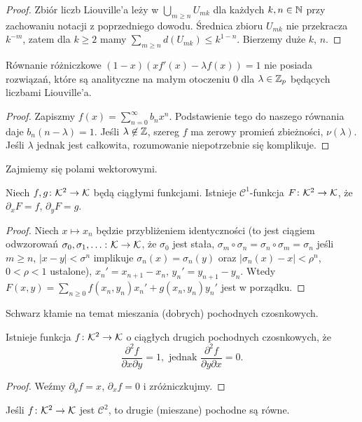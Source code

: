 \begin{proof}
	Zbiór liczb Liouville'a leży w $\bigcup_{m \ge n} U_{mk}$ dla każdych $k, n \in \mathbb N$ przy zachowaniu notacji z poprzedniego dowodu.
	Średnica zbioru $U_{mk}$ nie przekracza $k^{-m}$, zatem dla $k \ge 2$ mamy $\sum_{m \ge n} d(U_{mk}) \le k^{1-n}$.
	Bierzemy duże $k$, $n$.
\end{proof}

\begin{fakt}
	Równanie różniczkowe $(1-x)(x f'(x) - \lambda f(x)) = 1$ nie posiada rozwiązań, które są analityczne na małym otoczeniu $0$ dla $\lambda \in \mathbb Z_p$ będących liczbami Liouville'a.
\end{fakt}

\begin{proof}
	Zapiszmy $f(x) = \sum_{n=0}^\infty b_n x^n$.
	Podstawienie tego do naszego równania daje $b_n (n - \lambda ) = 1$.
	Jeśli $\lambda \not \in \mathbb Z$, szereg $f$ ma zerowy promień zbieżności, $\nu(\lambda)$.
	Jeśli $\lambda$ jednak jest całkowita, rozumowanie niepotrzebnie się komplikuje.
\end{proof}

Zajmiemy się polami wektorowymi.

\begin{fakt}
	Niech $f, g \colon \mathcal K^2 \to \mathcal K$ będą ciągłymi funkcjami.
	Istnieje $\mathcal C^1$-funkcja $F \colon \mathcal K^2 \to \mathcal K$, że $\partial_x F = f$, $\partial_y F = g$.
\end{fakt}

\begin{proof}
	Niech $x \mapsto x_n$ będzie przybliżeniem identyczności (to jest ciągiem odwzorowań $\sigma_0, \sigma_1, \ldots \colon \mathcal K \to \mathcal K$, że $\sigma_0$ jest stała, $\sigma_m \circ \sigma_n = \sigma_n \circ \sigma_m = \sigma_n$ jeśli $m \ge n$, $|x - y| < \sigma^n$ implikuje $\sigma_n(x) = \sigma_n(y)$ oraz $|\sigma_n(x) - x| < \rho^n$, $0 < \rho < 1$ ustalone), $x_n' = x_{n+1} - x_n$, $y_n' = y_{n+1} - y_n$. 
	Wtedy $F(x, y) = \sum_{n \ge 0} f(x_n, y_n)x_n' +g(x_n, y_n)y_n'$ jest w porządku.
\end{proof}

Schwarz kłamie na temat mieszania (dobrych) pochodnych czosnkowych.

\begin{wniosek}
	Istnieje funkcja $f \colon \mathcal K^2 \to \mathcal K$ o ciągłych drugich pochodnych czosnkowych, że
	\[
		\frac{\partial^2 f}{\partial x \partial y} = 1, \mbox{ jednak }
		\frac{\partial^2 f}{\partial y \partial x} = 0.
	\]
\end{wniosek}

\begin{proof}
	Weźmy $\partial_y f = x$, $\partial_xf = 0$ i zróżniczkujmy.
\end{proof}

\begin{fakt}
	Jeśli $f \colon \mathcal K^2 \to \mathcal K$ jest $\mathcal C^2$, to drugie (mieszane) pochodne są równe.
\end{fakt}